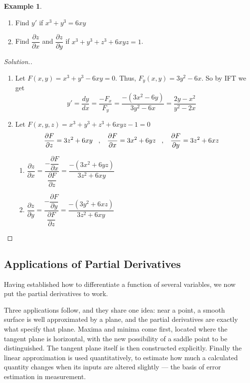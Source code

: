 \documentclass[11pt,a4paper]{article}
\theoremstyle{definition}
\newtheorem{exa}[thm]{Example}
\newenvironment{solution}
  {\renewcommand{\qedsymbol}{}\begin{proof}[\textit{Solution}.]}
  {\end{proof}}
\begin{document}
\begin{exa}
\begin{enumerate}
\item Find $y'$ if $x^3 + y^3 = 6xy$

\item Find $\dfrac{\partial z}{\partial x}$ and $\dfrac{\partial z}{\partial y}$ if $x^3 + y^3 + z^3 + 6xyz = 1$.
\end{enumerate}
\end{exa}

\begin{solution}
\begin{enumerate}
\item Let $F(x,y) = x^3 + y^3 - 6xy = 0$. Thus, $F_y (x,y) = 3y^2 - 6x$. So by IFT we get $$y' = \dfrac{dy}{dx} = \dfrac{-F_x}{F_y} = \dfrac{-(3x^2 - 6y)}{3y^2 - 6x} = \dfrac{2y - x^2 }{y^2 - 2x}$$

\item Let $F(x,y,z) = x^3 + y^3 + z^3 + 6xyz - 1 = 0$
$$\dfrac{\partial F}{\partial z}  = 3z^2 + 6xy \hspace{0.3cm} , \hspace{0.3cm} \dfrac{\partial F}{\partial x} = 3x^2 + 6yz\hspace{0.3cm} , \hspace{0.3cm} \dfrac{\partial F}{\partial y} = 3z^2 + 6xz$$
\begin{enumerate}
      \item $\displaystyle{\dfrac{\partial z}{\partial x} = \dfrac{-\dfrac{\partial F}{\partial x}}{\dfrac{\partial F}{\partial z}} = \dfrac{-(3x^2 + 6yz)}{3z^2 + 6xy}}$

      \item $\displaystyle{\dfrac{\partial z}{\partial y} = \dfrac{-\dfrac{\partial F}{\partial y}}{\dfrac{\partial F}{\partial z}} = \dfrac{-(3y^2 + 6xz)}{3z^2 + 6xy}}$
\end{enumerate}
\end{enumerate}
\end{solution}

\subsection{Applications of Partial Derivatives}

Having established how to differentiate a function of several variables, we now
put the partial derivatives to work.

Three applications follow, and they share one idea: near a point, a smooth
surface is well approximated by a plane, and the partial derivatives are exactly
what specify that plane. Maxima and minima come first, located where the tangent
plane is horizontal, with the new possibility of a saddle point to be
distinguished. The tangent plane itself is then constructed explicitly. Finally
the linear approximation is used quantitatively, to estimate how much a
calculated quantity changes when its inputs are altered slightly --- the basis
of error estimation in measurement.
\end{document}
